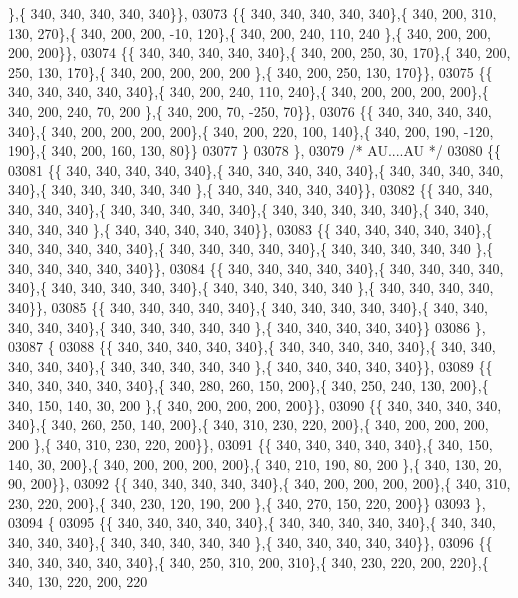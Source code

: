 \begin{DoxyCode}
      \},\{ 340, 340, 340, 340, 340\}\},
03073 \{\{ 340, 340, 340, 340, 340\},\{ 340, 200, 310, 130, 270\},\{ 340, 200, 200, -10, 120\},\{ 340, 200, 240, 110, 240
      \},\{ 340, 200, 200, 200, 200\}\},
03074 \{\{ 340, 340, 340, 340, 340\},\{ 340, 200, 250,  30, 170\},\{ 340, 200, 250, 130, 170\},\{ 340, 200, 200, 200, 200
      \},\{ 340, 200, 250, 130, 170\}\},
03075 \{\{ 340, 340, 340, 340, 340\},\{ 340, 200, 240, 110, 240\},\{ 340, 200, 200, 200, 200\},\{ 340, 200, 240,  70, 200
      \},\{ 340, 200,  70, -250,  70\}\},
03076 \{\{ 340, 340, 340, 340, 340\},\{ 340, 200, 200, 200, 200\},\{ 340, 200, 220, 100, 140\},\{ 340, 200, 190, -120, 
      190\},\{ 340, 200, 160, 130,  80\}\}
03077 \}
03078 \},
03079 \textcolor{comment}{/* AU....AU */}
03080 \{\{
03081 \{\{ 340, 340, 340, 340, 340\},\{ 340, 340, 340, 340, 340\},\{ 340, 340, 340, 340, 340\},\{ 340, 340, 340, 340, 340
      \},\{ 340, 340, 340, 340, 340\}\},
03082 \{\{ 340, 340, 340, 340, 340\},\{ 340, 340, 340, 340, 340\},\{ 340, 340, 340, 340, 340\},\{ 340, 340, 340, 340, 340
      \},\{ 340, 340, 340, 340, 340\}\},
03083 \{\{ 340, 340, 340, 340, 340\},\{ 340, 340, 340, 340, 340\},\{ 340, 340, 340, 340, 340\},\{ 340, 340, 340, 340, 340
      \},\{ 340, 340, 340, 340, 340\}\},
03084 \{\{ 340, 340, 340, 340, 340\},\{ 340, 340, 340, 340, 340\},\{ 340, 340, 340, 340, 340\},\{ 340, 340, 340, 340, 340
      \},\{ 340, 340, 340, 340, 340\}\},
03085 \{\{ 340, 340, 340, 340, 340\},\{ 340, 340, 340, 340, 340\},\{ 340, 340, 340, 340, 340\},\{ 340, 340, 340, 340, 340
      \},\{ 340, 340, 340, 340, 340\}\}
03086 \},
03087 \{
03088 \{\{ 340, 340, 340, 340, 340\},\{ 340, 340, 340, 340, 340\},\{ 340, 340, 340, 340, 340\},\{ 340, 340, 340, 340, 340
      \},\{ 340, 340, 340, 340, 340\}\},
03089 \{\{ 340, 340, 340, 340, 340\},\{ 340, 280, 260, 150, 200\},\{ 340, 250, 240, 130, 200\},\{ 340, 150, 140,  30, 200
      \},\{ 340, 200, 200, 200, 200\}\},
03090 \{\{ 340, 340, 340, 340, 340\},\{ 340, 260, 250, 140, 200\},\{ 340, 310, 230, 220, 200\},\{ 340, 200, 200, 200, 200
      \},\{ 340, 310, 230, 220, 200\}\},
03091 \{\{ 340, 340, 340, 340, 340\},\{ 340, 150, 140,  30, 200\},\{ 340, 200, 200, 200, 200\},\{ 340, 210, 190,  80, 200
      \},\{ 340, 130,  20,  90, 200\}\},
03092 \{\{ 340, 340, 340, 340, 340\},\{ 340, 200, 200, 200, 200\},\{ 340, 310, 230, 220, 200\},\{ 340, 230, 120, 190, 200
      \},\{ 340, 270, 150, 220, 200\}\}
03093 \},
03094 \{
03095 \{\{ 340, 340, 340, 340, 340\},\{ 340, 340, 340, 340, 340\},\{ 340, 340, 340, 340, 340\},\{ 340, 340, 340, 340, 340
      \},\{ 340, 340, 340, 340, 340\}\},
03096 \{\{ 340, 340, 340, 340, 340\},\{ 340, 250, 310, 200, 310\},\{ 340, 230, 220, 200, 220\},\{ 340, 130, 220, 200, 220

\end{DoxyCode}
